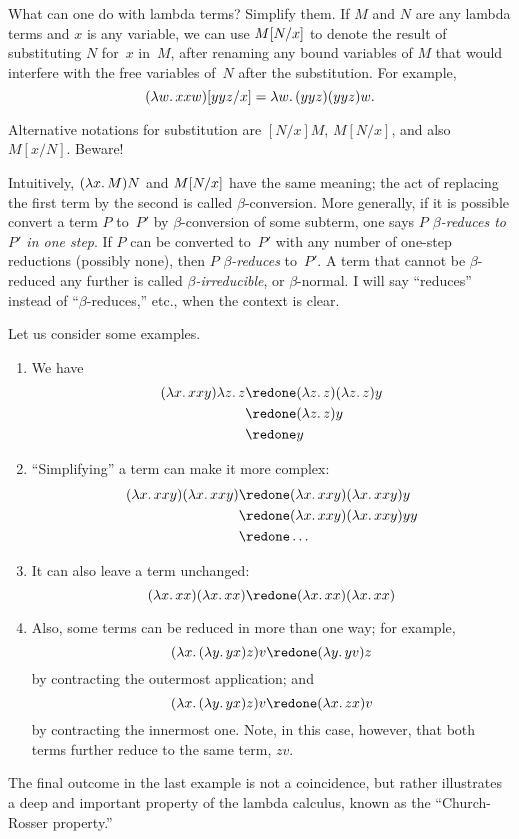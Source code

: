 \documentclass[../../../include/open-logic-section]{subfiles}
\begin{document}

What can one do with lambda terms? Simplify them. If $M$ and $N$ are
any lambda terms and $x$ is any variable, we can use $M[N/x]$ to
denote the result of substituting $N$ for~$x$ in~$M$, after renaming
any bound variables of $M$ that would interfere with the free
variables of~$N$ after the substitution. For example,
\[
\Subst{(\lambd[w][xxw])}{yyz}{x} = \lambd[w][(yyz)(yyz)w].
\]

\begin{digress}
Alternative notations for substitution are $[N/x]M$, $M[N/x]$, and
also $M[x/N]$. Beware!
\end{digress}

Intuitively, $(\lambd[x][M])N$ and $M[N/x]$ have the same
meaning; the act of replacing the first term by the second is called
$\beta$-conversion. More generally, if it is possible convert a
term $P$ to~$P'$ by $\beta$-conversion of some subterm, one says
\emph{$P$ $\beta$-reduces to $P'$ in one step}. If $P$ can be
converted to~$P'$ with any number of one-step reductions (possibly
none), then $P$ \emph{$\beta$-reduces} to~$P'$. A term that cannot be
$\beta$-reduced any further is called \emph{$\beta$-irreducible}, or
$\beta$-normal. I will say ``reduces'' instead of ``$\beta$-reduces,''
etc., when the context is clear.

Let us consider some examples.
\begin{enumerate}
\item We have
\begin{align*}
(\lambd[x][xxy]) \lambd[z][z] & \redone (\lambd[z][z])(\lambd[z][z]) y \\
& \redone (\lambd[z][z]) y \\
& \redone y
\end{align*}
\item ``Simplifying'' a term can make it more complex:
\begin{align*}
(\lambd[x][xxy])(\lambd[x][xxy]) & \redone (\lambd[x][xxy])(\lambd[x][xxy])y \\
& \redone (\lambd[x][xxy])(\lambd[x][xxy])yy \\
& \redone \dots
\end{align*}
\item It can also leave a term unchanged:
\[
(\lambd[x][xx])(\lambd[x][xx]) \redone (\lambd[x][xx])(\lambd[x][xx])
\]
\item Also, some terms can be reduced in more than one way; for
  example,
\[
(\lambd[x][(\lambd[y][yx]) z)] v \redone (\lambd[y][yv]) z
\]
by contracting the outermost application; and
\[
(\lambd[x][(\lambd[y][yx]) z)] v \redone (\lambd[x][zx]) v
\]
by contracting the innermost one. Note, in this case, however, that
both terms further reduce to the same term, $zv$.
\end{enumerate}

The final outcome in the last example is not a coincidence, but rather
illustrates a deep and important property of the lambda calculus, known as the
``Church-Rosser property.''
\end{document}
